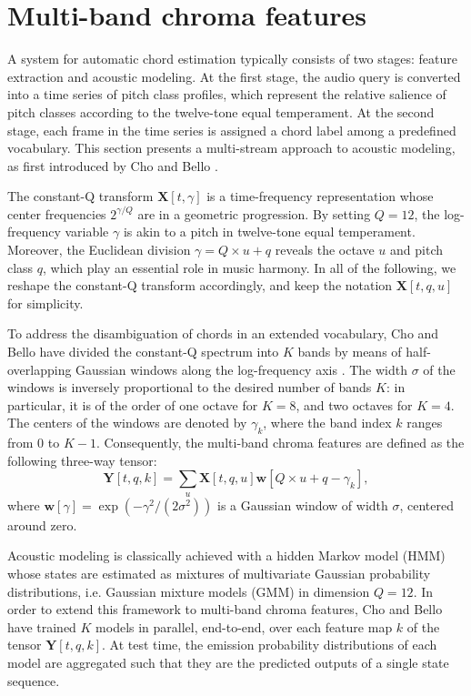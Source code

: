 \documentclass{article}
\makeatletter
\newcommand*{\ie}{i.e.\@\xspace}
\makeatother
\begin{document}
\section{Multi-band chroma features}
A system for automatic chord estimation typically consists of two stages:
feature extraction and acoustic modeling.
At the first stage, the audio query is converted into a time series of
pitch class profiles, which represent the relative salience of
pitch classes according to the twelve-tone equal temperament.
At the second stage, each frame in the time series is assigned
a chord label among a predefined vocabulary.
This section presents a multi-stream approach to acoustic modeling,
as first introduced by Cho and Bello \cite{cho2013mirex}.

The constant-Q transform $\mathbf{X}[t, \gamma]$ is a time-frequency
representation whose center frequencies $2^{\gamma/Q}$ are in a geometric progression.
By setting $Q=12$, the log-frequency variable $\gamma$ is akin to a pitch in twelve-tone
equal temperament.
Moreover, the Euclidean division $\gamma = Q \times u + q$
reveals the octave $u$ and pitch class $q$,
which play an essential role in music harmony.
In all of the following, we reshape the constant-Q transform
accordingly, and keep the notation $\mathbf{X}[t, q, u]$ for simplicity.

To address the disambiguation of chords in an extended vocabulary,
Cho and Bello have divided the constant-Q spectrum into $K$
bands by means of half-overlapping Gaussian windows along
the log-frequency axis \cite{cho2013mirex}.
The width $\sigma$ of the windows is inversely proportional
to the desired number of bands $K$:
in particular, it is of the order of one octave for $K=8$,
and two octaves for $K=4$.
The centers of the windows are denoted by $\gamma_k$, where
the band index $k$ ranges from $0$ to $K-1$.
Consequently, the multi-band chroma features are defined as the following
three-way tensor:
\begin{equation}
\mathbf{Y}[t, q, k]
=
\sum_{u} 
\mathbf{X}[t, q, u]
\boldsymbol{w}[Q \times u + q - \gamma_k],
\end{equation}
where
$\boldsymbol{w}[\gamma] = \exp( - \gamma^2 / (2\sigma^2))$
is a Gaussian window of width $\sigma$, centered around zero.

Acoustic modeling is classically achieved with a hidden Markov model (HMM)
whose states are estimated as mixtures of multivariate Gaussian probability
distributions, \ie Gaussian mixture models (GMM) in dimension $Q=12$.
In order to extend this framework to multi-band chroma features, Cho and Bello
have trained $K$ models in parallel, end-to-end, over each feature map $k$
of the tensor $\mathbf{Y}[t, q, k]$.
At test time, the emission probability distributions of each model
are aggregated such that they are the predicted outputs of a single state sequence.
\end{document}
